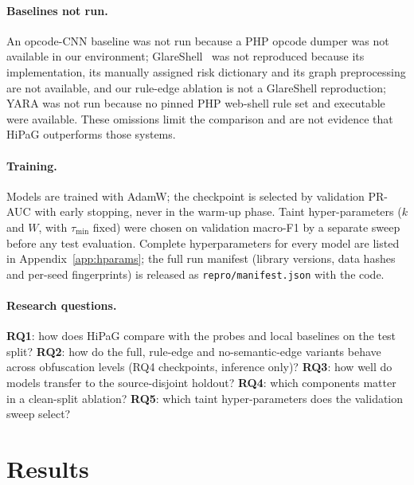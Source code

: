 \documentclass[pdflatex,sn-mathphys-num]{sn-jnl}
\begin{document}
\paragraph{Baselines not run.} An opcode-CNN baseline was not run because a PHP
opcode dumper was not available in our environment;
GlareShell~\cite{glareshell2024} was not reproduced because
its implementation, its manually assigned risk dictionary and its graph
preprocessing are not available, and our rule-edge ablation is not a GlareShell
reproduction; YARA was not run because no pinned PHP web-shell rule set and
executable were available. These omissions limit the comparison and are not
evidence that HiPaG outperforms those systems.

\paragraph{Training.} Models are trained with AdamW; the checkpoint is selected
by validation PR-AUC with early stopping, never in the warm-up phase. Taint
hyper-parameters ($k$ and $W$, with $\tau_{\min}$ fixed) were chosen on
validation macro-F1 by a separate sweep before any test evaluation. Complete
hyperparameters for every model are listed in Appendix~\ref{app:hparams}; the
full run manifest (library versions, data hashes and per-seed fingerprints) is
released as \texttt{repro/manifest.json} with the code.

\paragraph{Research questions.} \textbf{RQ1}: how does HiPaG compare with the
probes and local baselines on the test split? \textbf{RQ2}: how do the full,
rule-edge and no-semantic-edge variants behave across obfuscation levels (RQ4
checkpoints, inference only)? \textbf{RQ3}: how well do models transfer to the
source-disjoint holdout? \textbf{RQ4}: which components matter in a clean-split
ablation? \textbf{RQ5}: which taint hyper-parameters does the validation sweep
select?

\section{Results}\label{sec:results}
\end{document}
